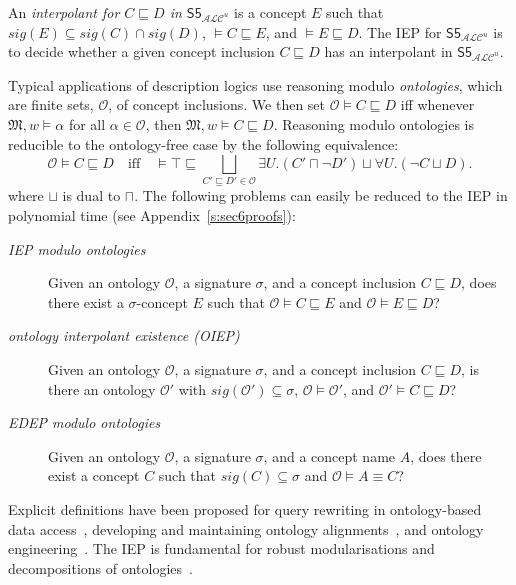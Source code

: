 \documentclass{lmcs} %
\theoremstyle{plain}\newtheorem{satz}[thm]{Satz} %
\newcommand{\sig}{\mathit{sig}}
\newcommand{\ALCIOS}{\ensuremath{\mathsf{S5}_{\mathcal{ALC}^u}}}
\begin{document}
An \emph{interpolant for $C \sqsubseteq D$ in $\ALCIOS$} is a concept $E$ such that $\sig(E) \subseteq \sig(C) \cap \sig(D)$, $\models C \sqsubseteq E$, and \mbox{$\models E \sqsubseteq D$}.
%
The IEP for $\ALCIOS$ is to decide whether a given concept inclusion $C \sqsubseteq D$ has an interpolant in $\ALCIOS$.

\begin{rem}\label{rem:dl}
Typical applications of description logics use reasoning modulo \emph{ontologies}, which are finite sets, $\mathcal{O}$, of concept inclusions. We then set $\mathcal{O}\models C\sqsubseteq D$ iff whenever $\mathfrak{M},w\models \alpha$ for all $\alpha \in \mathcal{O}$, then $\mathfrak{M},w\models C \sqsubseteq D$. Reasoning modulo ontologies is reducible to the ontology-free case by the following equivalence:
%
$$
\mathcal{O}\models C \sqsubseteq D \quad \text{iff} \quad
 \models \top \sqsubseteq  \bigsqcup_{C' \sqsubseteq D' \in \mathcal{O}}  \exists U. (C' \sqcap \neg D') \sqcup \forall U.(\neg C \sqcup D). 
$$
%
where $\sqcup$ is dual to $\sqcap$. 
%
The following problems can easily be reduced to the IEP in polynomial time (see Appendix~\ref{s:sec6proofs}): 
%
\begin{description}
\item[\emph{IEP modulo ontologies}] Given an ontology $\mathcal{O}$, a signature $\sigma$, and a concept inclusion $C \sqsubseteq D$, does there exist a $\sigma$-concept $E$ such that $\mathcal{O}\models C \sqsubseteq E$ and $\mathcal{O}\models E \sqsubseteq D$? 
	
\item[\emph{ontology interpolant existence \textup{(}OIEP\textup{)}}] Given an ontology $\mathcal{O}$, a signature $\sigma$, and a concept inclusion $C \sqsubseteq D$, is there an ontology $\mathcal{O}'$ with $\sig(\mathcal{O}') \subseteq \sigma$, $\mathcal{O}\models \mathcal{O}'$, and $\mathcal{O}' \models C \sqsubseteq D$? 
	
\item[\emph{EDEP modulo ontologies}] Given an ontology $\mathcal{O}$, a signature $\sigma$, and a concept name $A$, does there exist a concept $C$ such that $\sig(C)\subseteq \sigma$ and $\mathcal{O}\models A \equiv C$? 
\end{description}
\end{rem}

Explicit definitions have been proposed for query rewriting in ontology-based data access~\cite{FraEtAl13,TomWed21}, developing and maintaining ontology alignments~\cite{DBLP:conf/ekaw/GeletaPT16}, and ontology engineering~\cite{TenEtAl06}. The IEP is fundamental for robust  modularisations and decompositions of ontologies~\cite{DBLP:series/lncs/KonevLWW09,DBLP:conf/rweb/BotoevaKLRWZ16}. 
\end{document}
